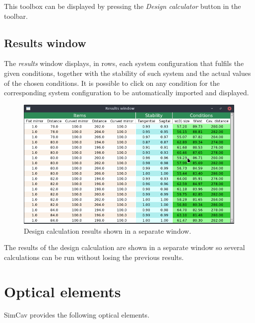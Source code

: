 \documentclass[11pt,a4paper,article,oneside]{memoir}
\begin{document}
			This toolbox can be displayed by pressing the \textit{Design calculator} button in the toolbar.
		
		\subsection{Results window}
		The \textit{results} window displays, in rows, each system configuration that fulfils the given conditions, together with the stability of such system and the actual values of the chosen conditions. It is possible to click on any condition for the corresponding system configuration to be automatically imported and displayed.
		
		\begin{figure}[h!]
			\centering
			\includegraphics[width=0.7\linewidth]{results-window.png}
			\caption[Results window]{Design calculation results shown in a separate window.}
			\label{fig:results}
		\end{figure}
		
		The results of the design calculation are shown in a separate window so several calculations can be run without losing the previous results.
	
	\newpage
	\section{Optical elements}
	SimCav provides the following optical elements.
	
\end{document}
